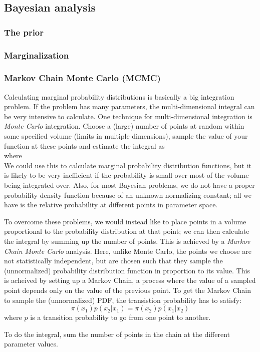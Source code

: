 \documentclass[12pt]{article}
\begin{document}
\subsection{Bayesian analysis}
\subsubsection{The prior}
\subsubsection{Marginalization}
\subsubsection{Markov Chain Monte Carlo (MCMC)}
Calculating marginal probability distributions is basically a big
integration problem. If the problem has many parameters, the
multi-dimensional integral can be very intensive to calculate.
One technique for multi-dimensional integration is
\emph{Monte Carlo} integration. Choose a (large) number of points
at random within some specified volume (limits in multiple
dimensions), sample the value of your function at these points
and estimate the integral as
$$  $$
where
$$ $$
We could use this to calculate marginal probability distribution
functions, but it is likely to be very inefficient if the probability
is small over most of the volume being integrated over. Also, for
most Bayesian problems, we do not have a proper probability density
function because of an unknown normalizing constant; all we have is
the relative probability at different points in parameter space.

To overcome these problems, we would instead like to place points
in a volume proportional to the probability distribution at that
point; we can then calculate the integral by summing up the number
of points. This is achieved by a \emph{Markov Chain Monte Carlo}
analysis. Here, unlike Monte Carlo, the points we choose are not
statistically independent, but are chosen such that they sample
the (unnormalized) probability distribution function in proportion
to its value. This is acheived by setting up a Markov Chain,
a process where the value of a sampled point depends only on
the value of the previous point. To get the Markov Chain to sample
the (unnormalized) PDF, the transistion probability has to satisfy:
$$ \pi(x_1)p(x_2|x_1) = \pi(x_2)p(x_1|x_2)  $$
where $p$ is a transition probability to go from one point to another.

To do the integral, sum the number of points in the chain at the
different parameter values.
\end{document}
